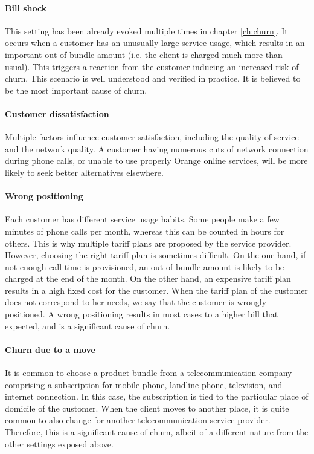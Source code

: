 \paragraph{Bill shock} This setting has been already evoked multiple times in
chapter \ref{ch:churn}. It occurs when a customer has an unusually large
service usage, which results in an important out of bundle amount (i.e. the
client is charged much more than usual). This triggers a reaction from the
customer inducing an increased risk of churn. This scenario is well understood
and verified in practice. It is believed to be the most important cause of
churn.

\paragraph{Customer dissatisfaction} Multiple factors influence customer
satisfaction, including the quality of service and the network quality. A
customer having numerous cuts of network connection during phone calls, or
unable to use properly Orange online services, will be more likely to seek
better alternatives elsewhere.

\paragraph{Wrong positioning} Each customer has different service usage habits.
Some people make a few minutes of phone calls per month, whereas this can be
counted in hours for others. This is why multiple tariff plans are proposed by the
service provider. However, choosing the right tariff plan is sometimes
difficult. On the one hand, if not enough call time is provisioned, an out of
bundle amount is likely to be charged at the end of the month. On the other
hand, an expensive tariff plan results in a high fixed cost for the customer.
When the tariff plan of the customer does not correspond to her needs, we say
that the customer is wrongly positioned. A wrong positioning results in most
cases to a higher bill that expected, and is a significant cause of churn.

\paragraph{Churn due to a move} It is common to choose a product bundle from a
telecommunication company comprising a subscription for mobile phone, landline
phone, television, and internet connection. In this case, the subscription is
tied to the particular place of domicile of the customer. When the client moves
to another place, it is quite common to also change for another
telecommunication service provider. Therefore, this is a significant cause of
churn, albeit of a different nature from the other settings exposed above.


